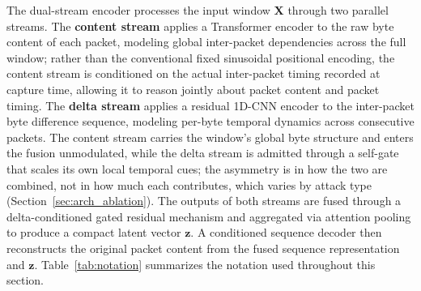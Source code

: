 The dual-stream encoder processes the input window $\mathbf{X}$ through two parallel streams. The \textbf{content stream} applies a Transformer encoder to the raw byte content of each packet, modeling global inter-packet dependencies across the full window; rather than the conventional fixed sinusoidal positional encoding, the content stream is conditioned on the actual inter-packet timing recorded at capture time, allowing it to reason jointly about packet content and packet timing. The \textbf{delta stream} applies a residual 1D-CNN encoder to the inter-packet byte difference sequence, modeling per-byte temporal dynamics across consecutive packets. The content stream carries the window's global byte structure and enters the fusion unmodulated, while the delta stream is admitted through a self-gate that scales its own local temporal cues; the asymmetry is in how the two are combined, not in how much each contributes, which varies by attack type (Section~\ref{sec:arch_ablation}). The outputs of both streams are fused through a delta-conditioned gated residual mechanism and aggregated via attention pooling to produce a compact latent vector $\mathbf{z}$. A conditioned sequence decoder then reconstructs the original packet content from the fused sequence representation and $\mathbf{z}$. Table~\ref{tab:notation} summarizes the notation used throughout this section.

